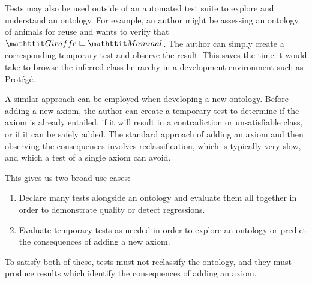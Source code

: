 \documentclass[paper.tex]{subfiles}
\begin{document}
Tests may also be used outside of an automated test suite to explore and understand an ontology.
For example, an author might be assessing an ontology of animals for reuse and wants to verify that $\oent{Giraffe} \sqsubseteq \oent{Mammal}$.
The author can simply create a corresponding temporary test and observe the result.
This saves the time it would take to browse the inferred class heirarchy in a development environment such as Prot\'eg\'e.

A similar approach can be employed when developing a new ontology.
Before adding a new axiom, the author can create a temporary test to determine if the axiom is already entailed, if it will result in a contradiction or unsatisfiable class, or if it can be safely added.
The standard approach of adding an axiom and then observing the consequences involves reclassification, which is typically very slow, and which a test of a single axiom can avoid.

This gives us two broad use cases:
\begin{enumerate}[nosep]
  \item
  \label{enum:usecase:regression}
  Declare many tests alongside an ontology and evaluate them all together in order to demonstrate quality or detect regressions.

  \item
  \label{enum:usecase:temp}
  Evaluate temporary tests as needed in order to explore an ontology or predict the consequences of adding a new axiom.
\end{enumerate}

To satisfy both of these, tests must not reclassify the ontology, and they must produce results which identify the consequences of adding an axiom.
\end{document}
